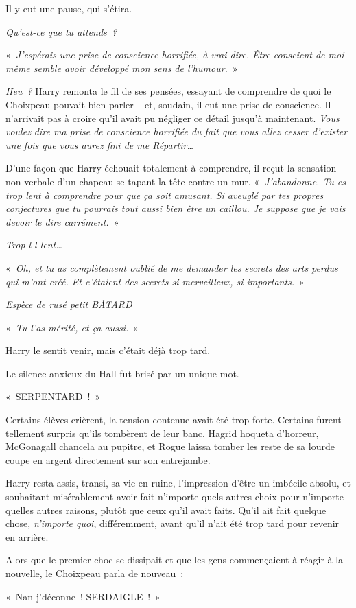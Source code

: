Il y eut une pause, qui s'étira.

\emph{Qu'est-ce que tu attends~?}

«~\emph{J'espérais une prise de conscience horrifiée, à vrai dire.
Être conscient de moi-même semble avoir développé mon sens de l'humour.}~»

\emph{Heu~?} Harry remonta le fil de ses pensées, essayant de comprendre de quoi le Choixpeau pouvait bien parler -- et, soudain, il eut une prise de conscience.
Il n'arrivait pas à croire qu'il avait pu négliger ce détail jusqu'à maintenant.
\emph{Vous voulez dire ma prise de conscience horrifiée du fait que vous allez cesser d'exister une fois que vous aurez fini de me Répartir…}

D'une façon que Harry échouait totalement à comprendre, il reçut la sensation non verbale d'un chapeau se tapant la tête contre un mur.
«~\emph{J'abandonne.
Tu es trop lent à comprendre pour que ça soit amusant.
Si aveuglé par tes propres conjectures que tu pourrais tout aussi bien être un caillou.
Je suppose que je vais devoir le dire carrément.}~»

\emph{Trop l-l-lent…}

«~\emph{Oh, et tu as complètement oublié de me demander les secrets des arts perdus qui m'ont créé.
Et c'étaient des secrets si merveilleux, si importants.}~»

\emph{Espèce de rusé petit BÂTARD}

«~\emph{Tu l'as mérité, et ça aussi.}~»

Harry le sentit venir, mais c'était déjà trop tard.

Le silence anxieux du Hall fut brisé par un unique mot.

«~SERPENTARD~!~»

Certains élèves crièrent, la tension contenue avait été trop forte.
Certains furent tellement surpris qu'ils tombèrent de leur banc.
Hagrid hoqueta d'horreur, McGonagall chancela au pupitre, et Rogue laissa tomber les reste de sa lourde coupe en argent directement sur son entrejambe.

Harry resta assis, transi, sa vie en ruine, l'impression d'être un imbécile absolu, et souhaitant misérablement avoir fait n'importe quels autres choix pour n'importe quelles autres raisons, plutôt que ceux qu'il avait faits.
Qu'il ait fait quelque chose, \emph{n'importe quoi}, différemment, avant qu'il n'ait été trop tard pour revenir en arrière.

Alors que le premier choc se dissipait et que les gens commençaient à réagir à la nouvelle, le Choixpeau parla de nouveau~:

«~Nan j'déconne~! SERDAIGLE~!~»
